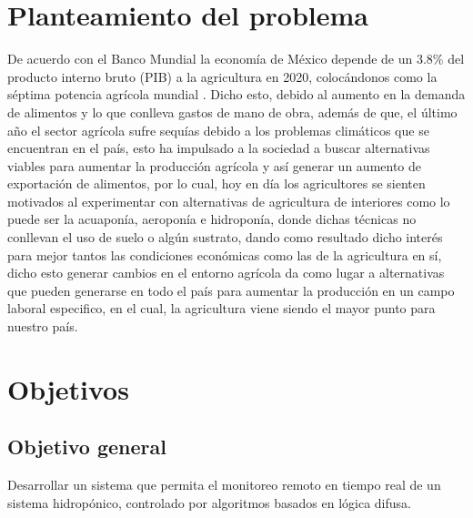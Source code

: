 \section{Planteamiento del problema} \label{chap:problema}
De acuerdo con el Banco Mundial la economía de México depende de un 3.8\% del producto interno bruto (PIB) a la agricultura en 2020, colocándonos como la séptima potencia agrícola mundial \cite{Bank}. Dicho esto, debido al aumento en la demanda de alimentos y lo que conlleva gastos de mano de obra, además de que, el último año el sector agrícola sufre sequías debido a los problemas climáticos que se encuentran en el país, esto ha impulsado a la sociedad a buscar alternativas viables para aumentar la producción agrícola y así generar un aumento de exportación de alimentos, por lo cual, hoy en día los agricultores se sienten motivados al experimentar con alternativas de agricultura de interiores como lo puede ser la acuaponía, aeroponía e hidroponía, donde dichas técnicas no conllevan el uso de suelo o algún sustrato, dando como resultado dicho interés para mejor tantos las condiciones económicas como las de la agricultura en sí, dicho esto generar cambios en el entorno agrícola da como lugar a alternativas que pueden generarse en todo el país para aumentar la producción en un campo laboral especifico, en el cual, la agricultura viene siendo el mayor punto para nuestro país.
\newpage
\section{Objetivos} \label{chap:objetivos}

\subsection{Objetivo general} \label{chap:ogeneral}
Desarrollar un sistema que permita el monitoreo remoto en tiempo real de un sistema hidropónico, controlado por algoritmos basados en lógica difusa.

